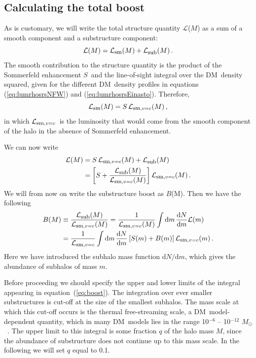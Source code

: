 \documentclass[aps,prd,twocolumn,amsmath,amssymb,floatfix,nofootinbib,10pt]{revtex4}
\newcommand{\DM}{DM}
\newcommand{\somm}{\ensuremath{S}}
\newcommand{\dd}{\mathrm{d}}
\newcommand{\eqnname}{equation}
\newcommand{\lum}{\ensuremath{\mathcal{L}}}
\newcommand{\lumsmooth}{\ensuremath{\lum_{\mbox{{\footnotesize sm}}}}}
\newcommand{\lumsmoothc}{\ensuremath{\lum_{\mbox{{\footnotesize sm}},v=c}}}
\newcommand{\lumsub}{\ensuremath{\lum_{\mbox{{\footnotesize sub}}}}}
\newcommand{\boost}{\ensuremath{B}}
\newcommand{\Msol}{\ensuremath{M_{\odot}}}
\begin{document}
\subsection{Calculating the total boost}

As is customary, we will write the total structure quantity \lum($M$) as a
sum of a smooth component and a substructure component:
\begin{equation}
\lum(M) = \lumsmooth(M) + \lumsub(M)\, .
\end{equation}
The smooth contribution to the structure quantity is the product of
the Sommerfeld enhancement \somm\ and the line-of-sight integral over
the \DM\ density squared, given for the different \DM\ density
profiles in \eqnname s (\ref{eq:lumrhosrsNFW}) and
(\ref{eq:lumrhosrsEinasto}). Therefore,
\begin{equation}
\lumsmooth(M) = \somm \, \lumsmoothc(M)\, ,
\end{equation}
in which \lumsmoothc\ is the luminosity that would come from the
smooth component of the halo in the absence of Sommerfeld enhancement.

We can now write
\begin{equation}
\begin{split}
\lum(M) & = \somm\,\lumsmoothc(M) + \lumsub(M)\\
&= \left[ \somm + \frac{\lumsub(M)}{\lumsmoothc(M)}\right] \lumsmoothc(M)\, .
\end{split}
\end{equation}
We will from now on write the substructure boost as \boost(M). Then we
have the following
\begin{equation}\label{eq:boost}
\begin{split}
\boost(M) & \equiv \frac{\lumsub(M)}{\lumsmoothc(M)} = \frac{1}{\lumsmoothc(M)} \int \dd m \, \frac{\dd N}{\dd m} \lum(m)\\
&= \frac{1}{\lumsmoothc} \int \dd m\, \frac{\dd N}{\dd m} \left[ \somm(m) + \boost(m) \right] \lumsmoothc(m)\, .
\end{split}
\end{equation}
Here we have introduced the subhalo mass function $\dd N/\dd m$, which
gives the abundance of subhalos of mass $m$.

Before proceeding we should specify the upper and lower limits of the
integral appearing in \eqnname\ (\ref{eq:boost}). The integration over
ever smaller substructures is cut-off at the size of the smallest
subhalos. The mass scale at which this cut-off occurs is the thermal
free-streaming scale, a \DM\ model-dependent quantity, which in many
\DM\ models lies in the range 10$^{-6}$ -- 10$^{-12}$ \Msol\
\cite{1999PhRvD..59d3517S,2001PhRvD..64h3507H,2004MNRAS.353L..23G,2005PhRvD..71j3520L,2006PhRvL..97c1301P}. The
upper limit to this integral is some fraction $q$ of the halo mass
$M$, since the abundance of substructure does not continue up to this
mass scale. In the following we will set $q$ equal to 0.1.
\end{document}
